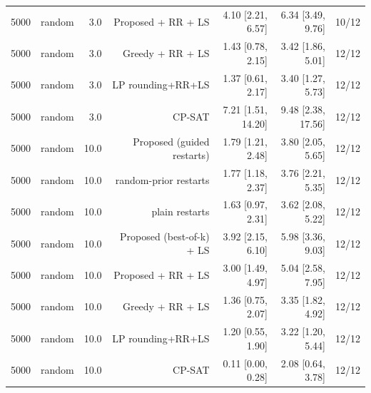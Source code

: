 \begin{table}[t]
\begin{tabular}{llrrrrr}
5000 & random & 3.0 & Proposed + RR + LS & 4.10 [2.21, 6.57] & 6.34 [3.49, 9.76] & 10/12 \\
5000 & random & 3.0 & Greedy + RR + LS & 1.43 [0.78, 2.15] & 3.42 [1.86, 5.01] & 12/12 \\
5000 & random & 3.0 & LP rounding+RR+LS & 1.37 [0.61, 2.17] & 3.40 [1.27, 5.73] & 12/12 \\
5000 & random & 3.0 & CP-SAT & 7.21 [1.51, 14.20] & 9.48 [2.38, 17.56] & 12/12 \\
5000 & random & 10.0 & Proposed (guided restarts) & 1.79 [1.21, 2.48] & 3.80 [2.05, 5.65] & 12/12 \\
5000 & random & 10.0 & random-prior restarts & 1.77 [1.18, 2.37] & 3.76 [2.21, 5.35] & 12/12 \\
5000 & random & 10.0 & plain restarts & 1.63 [0.97, 2.31] & 3.62 [2.08, 5.22] & 12/12 \\
5000 & random & 10.0 & Proposed (best-of-k) + LS & 3.92 [2.15, 6.10] & 5.98 [3.36, 9.03] & 12/12 \\
5000 & random & 10.0 & Proposed + RR + LS & 3.00 [1.49, 4.97] & 5.04 [2.58, 7.95] & 12/12 \\
5000 & random & 10.0 & Greedy + RR + LS & 1.36 [0.75, 2.07] & 3.35 [1.82, 4.92] & 12/12 \\
5000 & random & 10.0 & LP rounding+RR+LS & 1.20 [0.55, 1.90] & 3.22 [1.20, 5.44] & 12/12 \\
5000 & random & 10.0 & CP-SAT & 0.11 [0.00, 0.28] & 2.08 [0.64, 3.78] & 12/12 \\
\bottomrule
\end{tabular}
\end{table}
